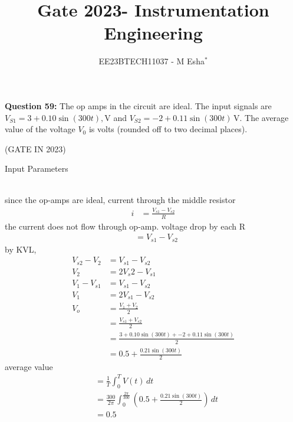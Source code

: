 \documentclass[journal,12pt,twocolumn]{IEEEtran}
\theoremstyle{remark}
\begin{document}

\vspace{3cm}

\title{Gate 2023- Instrumentation Engineering}
\author{EE23BTECH11037 - M Esha$^{*}$%
}
\maketitle
\newpage
\bigskip

\renewcommand{\thefigure}{\theenumi}
\renewcommand{\thetable}{\theenumi}

\vspace{3cm}
\textbf{Question 59:} 
The op amps in the circuit are ideal. The input signals are $V_{S1} = 3 + 0.10 \sin(300t), \text{V}$ and $V_{S2} = -2 + 0.11 \sin(300t)\, \text{V}$. The average value of the voltage $V_0$ is \underline{\hspace{1cm}} volts (rounded off to two decimal places).

\begin{figure}[ht]
\centering
\resizebox{0.55\columnwidth}{!}{}
\end{figure}
\hfill{(GATE IN 2023)}\\
\solution
\begin{table}[h!]
  \centering
  
  \caption{Input Parameters}
    \label{tab:table1}
\end{table}\\
since the op-amps are ideal, current through the middle resistor 
\begin{align}
i&= \frac{V_{s1}-V_{s2}}{R}
\end{align}
the current does not flow through op-amp. voltage drop by each R
\begin{align}
&= V_{s1}-V_{s2}
\end{align}
by KVL,
\begin{align}
V_{s2}-V_2&=V_{s1}-V_{s2}\\
V_2&=2V_{s}2-V_{s1}\\
V_1-V_{s1}&=V_{s1}-V_{s2}\\
V_1&= 2V_{s1}-V_{s2}\\
V_o&= \frac{V_1+V_2}{2}\\
&=\frac{V_{s1}+V_{s2}}{2}\\
&=\frac{3+0.10\sin(300t)+{-2}+0.11\sin(300t)}{2}\\
&=0.5+ \frac{0.21\sin(300t)}{2}
\end{align}
average value
\begin{align}
&=\frac{1}{T} \int_{0}^{T} V(t) \,dt\\
&=\frac{300}{2\pi} \int_{0}^{\frac{2\pi}{300}} \left(0.5 + \frac{0.21 \sin(300t)}{2}\right) \, dt\\
&=0.5
\end{align}
\end{document}
